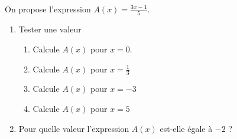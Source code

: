 
On propose l'expression $A(x)=\frac{3x-1}{5}$.

\begin{enumerate}
\item Tester une valeur
\begin{enumerate}
\item Calcule $A(x)$ pour $x=0$.
\item Calcule $A(x)$ pour $x=\frac{1}{3}$
\item Calcule $A(x)$ pour $x=-3$
\item Calcule $A(x)$ pour $x=5$
\end{enumerate}
\item Pour quelle valeur l'expression $A(x)$ est-elle égale à $-2$ ?
\end{enumerate}